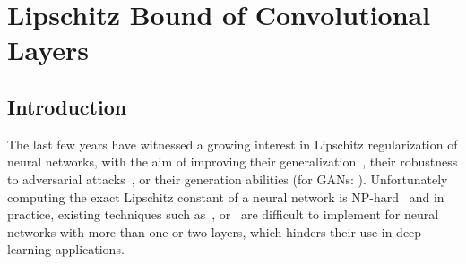 \chapter{Lipschitz Bound of Convolutional Layers}
\label{chapter:ch5-lipschitz_bound}
\localtoc



\section{Introduction}
\label{section:ch5-introduction}


The last few years have witnessed a growing interest in Lipschitz regularization of neural networks, with the aim of improving their generalization~\cite{bartlett2017spectrally}, their robustness to adversarial attacks~\cite{tsuzuku2018lipschitz, farnia2018generalizable}, or their generation abilities (\eg for GANs: \citet{miyato2018spectral,arjovsky2017wasserstein}).
Unfortunately computing  the exact Lipschitz constant of a neural network is NP-hard~\cite{scaman2018lipschitz} and in practice, existing techniques such as~\citet{scaman2018lipschitz}, \citet{fazlyab2019efficient} or~\citet{latorre2020lipschitz} are difficult to implement for neural networks with more than one or two layers, which hinders their use in deep learning applications.

